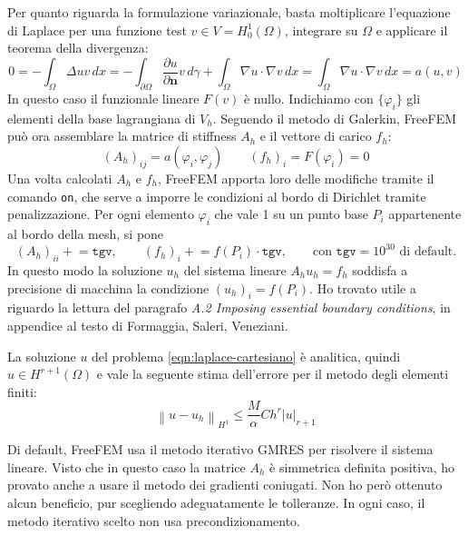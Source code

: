 \documentclass[a4paper]{article}
\newcommand{\dx}{\, dx}
\newcommand{\dgamma}{\, d\gamma}
\newcommand{\pluseq}{\mathrel{+}=}
\newcommand{\normhone}[1]{\left\lVert#1\right\rVert_{H^1}}
\newcommand{\seminorm}[1]{\left\lvert#1\right\rvert}
\begin{document}
Per quanto riguarda la formulazione variazionale, basta moltiplicare
l'equazione di Laplace per una funzione test $v \in V = H_0^1(\Omega)$,
integrare su $\Omega$ e applicare il teorema della divergenza:
\[
0
= - \int_\Omega{\Delta u v \dx}
= - \int_{\partial\Omega}{\frac{\partial u}{\partial \mathbf{n}} v \dgamma}
  + \int_\Omega{\nabla u \cdot \nabla v \dx}
=   \int_\Omega{\nabla u \cdot \nabla v \dx}
= a(u,v)
\]
In questo caso il funzionale lineare $F(v)$ è nullo.
Indichiamo con $\{\varphi_i\}$ gli elementi della base lagrangiana di $V_h$.
Seguendo il metodo di Galerkin, FreeFEM può ora assemblare la matrice
di stiffness $A_h$ e il vettore di carico $f_h$:
\[
(A_h)_{ij} = a(\varphi_i,\varphi_j) \qquad (f_h)_i = F(\varphi_i) = 0
\]
Una volta calcolati $A_h$ e $f_h$, FreeFEM apporta loro delle modifiche
tramite il comando \texttt{on}, che serve a imporre le condizioni al bordo
di Dirichlet tramite penalizzazione.
Per ogni elemento $\varphi_i$ che vale 1 su un punto base $P_i$ appartenente
al bordo della mesh, si pone
\[
(A_h)_{ii} \pluseq \texttt{tgv}, \qquad
(f_h)_i \pluseq f(P_i) \cdot \texttt{tgv}, \qquad
\text{con $\texttt{tgv} = 10^{30}$ di default.}
\]
In questo modo la soluzione $u_h$ del sistema lineare $A_h u_h = f_h$ soddisfa
a precisione di macchina la condizione $(u_h)_i = f(P_i)$.
Ho trovato utile a riguardo la lettura del paragrafo \textit{A.2 Imposing essential boundary conditions},
in appendice al testo di Formaggia, Saleri, Veneziani.

La soluzione $u$ del problema \eqref{eqn:laplace-cartesiano} è analitica,
quindi $u \in H^{r+1}(\Omega)$ e vale la seguente stima dell'errore
per il metodo degli elementi finiti:
\[
\normhone{u-u_h} \leq \frac{M}{\alpha} C h^r \seminorm{u}_{r+1}
\]

Di default, FreeFEM usa il metodo iterativo GMRES per risolvere il sistema lineare.
Visto che in questo caso la matrice $A_h$ è simmetrica definita positiva,
ho provato anche a usare il metodo dei gradienti coniugati.
Non ho però ottenuto alcun beneficio, pur scegliendo adeguatamente le tolleranze.
In ogni caso, il metodo iterativo scelto non usa precondizionamento.
\end{document}

